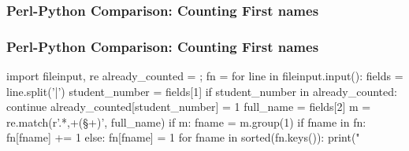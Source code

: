 \begin{frame}[fragile]
\frametitle{Perl-Python Comparison: Counting First names}

{\small
{}
}

\end{frame}

\begin{frame}[fragile]
\frametitle{Perl-Python Comparison: Counting First names}
{\small
\begin{python}
import fileinput, re
already_counted = {}; fn = {}
for line in fileinput.input():
    fields = line.split('|')
    student_number = fields[1]
    if student_number in already_counted: continue
    already_counted[student_number] = 1
    full_name = fields[2]
    m = re.match(r'.*,\s+(\S+)', full_name)
    if m:
        fname = m.group(1)
        if fname in fn:
            fn[fname] += 1
        else:
            fn[fname] = 1
for fname in sorted(fn.keys()):
    print("%
\end{python}
}
\end{frame}


